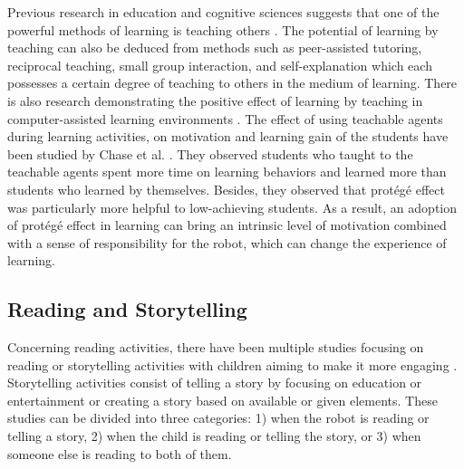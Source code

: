 \documentclass{sigchi}
\begin{document}
Previous research in education and cognitive sciences suggests that one of the powerful methods of learning is teaching others \cite{bargh1980cognitive}.
The potential of learning by teaching can also be deduced from methods such as peer-assisted tutoring, reciprocal teaching, small group interaction, and self-explanation which each possesses a certain degree of teaching to others in the medium of learning. 
There is also research demonstrating the positive effect of learning by teaching in computer-assisted learning environments \cite{biswas2005learning,chase2009teachable}. 
The effect of using teachable agents during learning activities, on motivation and learning gain of the students have been studied by Chase et al. \cite{chase2009teachable}. 
They observed students who taught to the teachable agents spent more time on learning behaviors and learned more than students who learned by themselves.
Besides, they observed that protégé effect was particularly more helpful to low-achieving students. 
As a result, an adoption of protégé effect in learning can bring an intrinsic level of motivation combined with a sense of responsibility for the robot, which can change the experience of learning. 

\subsection{Reading and Storytelling}
Concerning reading activities, there have been multiple studies focusing on reading or storytelling activities with children aiming to make it more engaging \cite{rubegni2016evaluating}. 
Storytelling activities consist of telling a story by focusing on education or entertainment or creating a story based on available or given elements.
These studies can be divided into three categories: 1) when the robot is reading or telling a story, 2) when the child is reading or telling the story, or 3) when someone else is reading to both of them. 
\end{document}
